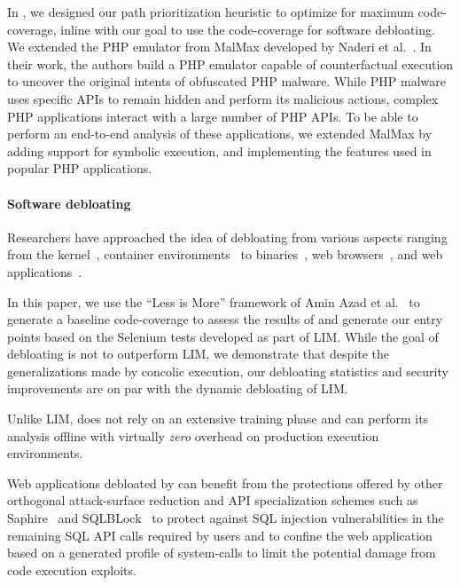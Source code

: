 In \animatedead{}, we designed our path prioritization heuristic to optimize for maximum code-coverage, inline with our goal to use the code-coverage for software debloating. 
We extended the PHP emulator from MalMax developed by Naderi et al.~\cite{naderi2019malmax,naderi2019cubismo}. 
In their work, the authors build a PHP emulator capable of counterfactual execution to uncover the original intents of obfuscated PHP malware. 
While PHP malware uses specific APIs to remain hidden and perform its malicious actions, complex PHP applications interact with a large number of PHP APIs. 
To be able to perform an end-to-end analysis of these applications, we extended MalMax by adding support for symbolic execution, and implementing the features used in popular PHP applications. 

\paragraph{Software debloating} 
Researchers have approached the idea of debloating from various aspects ranging from the kernel~\cite{abubakar2021shard}, container environments~\cite{rastogi2017cimplifier, 259711} to binaries~\cite{hasan2022decap, redini2019b, heo2018effective, ghavamnia2020temporal, mishra2020saffire, koo2019configuration, quach2018debloating}, web browsers~\cite{snyder2017vibrate, qian2020slimium}, and web applications~\cite{azad2019less, bulekov2021saphire, mininode, jahanshahi2020you}.

In this paper, we use the ``Less is More'' framework of Amin Azad et al.~\cite{azad2019less} to generate a baseline code-coverage to assess the results of \animatedead{} and generate our entry points based on the Selenium tests developed as part of LIM. 
While the goal of \animatedead{} debloating is not to outperform LIM, we demonstrate that despite the generalizations made by concolic execution, our debloating statistics and security improvements are on par with the dynamic debloating of LIM. 

Unlike LIM, \animatedead{} does not rely on an extensive training phase and can perform its analysis offline with virtually \emph{zero} overhead on production execution environments. 

Web applications debloated by \animatedead{} can benefit from the protections offered by other orthogonal attack-surface reduction and API specialization schemes such as Saphire~\cite{bulekov2021saphire} and SQLBLock~\cite{jahanshahi2020you} to protect against SQL injection vulnerabilities in the remaining SQL API calls required by users and to confine the web application based on a generated profile of system-calls to limit the potential damage from code execution exploits.

